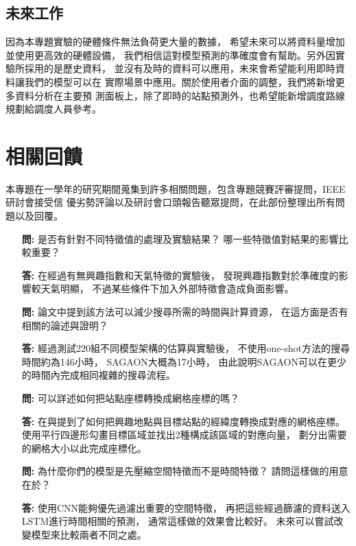 \documentclass[a4paper,12pt]{extarticle}
\begin{document}
        \subsection{未來工作}
            因為本專題實驗的硬體條件無法負荷更大量的數據，
            希望未來可以將資料量增加並使用更高效的硬體設備，
            我們相信這對模型預測的準確度會有幫助。另外因實驗所採用的是歷史資料，
            並沒有及時的資料可以應用，未來會希望能利用即時資料讓我們的模型可以在
            實際場景中應用。關於使用者介面的調整，我們將新增更多資料分析在主要預
            測面板上，除了即時的站點預測外，也希望能新增調度路線規劃給調度人員參考。

    \section{相關回饋}
        本專題在一學年的研究期間蒐集到許多相關問題，包含專題競賽評審提問，IEEE研討會接受信
        優劣勢評論以及研討會口頭報告聽眾提問，在此部份整理出所有問題以及回覆。
        \begin{itemize}
            \item [\textbf{問:}]
            是否有針對不同特徵值的處理及實驗結果？
            哪一些特徵值對結果的影響比較重要？
            \item [\textbf{答:}]
            在經過有無興趣指數和天氣特徵的實驗後，
            發現興趣指數對於準確度的影響較天氣明顯，
            不過某些條件下加入外部特徵會造成負面影響。
            \item [\textbf{問:}]
            論文中提到該方法可以減少搜尋所需的時間與計算資源，
            在這方面是否有相關的論述與證明？
            \item [\textbf{答:}]
            經過測試220組不同模型架構的估算與實驗後，
            不使用one-shot方法的搜尋時間約為146小時，
            SAGAON大概為17小時，
            由此說明SAGAON可以在更少的時間內完成相同複雜的搜尋流程。
            \item [\textbf{問:}]
            可以詳述如何把站點座標轉換成網格座標的嗎？
            \item [\textbf{答:}]
            在與提到了如何把興趣地點與目標站點的經緯度轉換成對應的網格座標。
            使用平行四邊形勾畫目標區域並找出2種構成該區域的對應向量，
            劃分出需要的網格大小以此完成座標化。
            \item [\textbf{問:}]
            為什麼你們的模型是先壓縮空間特徵而不是時間特徵？
            請問這樣做的用意在於？
            \item [\textbf{答:}]
            使用CNN能夠優先過濾出重要的空間特徵，
            再把這些經過篩濾的資料送入LSTM進行時間相關的預測，
            通常這樣做的效果會比較好。
            未來可以嘗試改變模型來比較兩者不同之處。
        \end{itemize}
\end{document}
